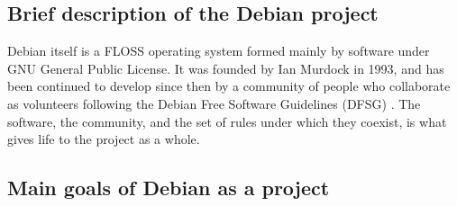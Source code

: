 \documentclass[11pt]{article} %
\begin{document}
\subsection{Brief description of the Debian project}

Debian itself is a FLOSS operating system formed mainly by software under GNU General Public License. It was founded by Ian Murdock in 1993, and has been continued to develop since then by a community of people who collaborate as volunteers following the Debian Free Software Guidelines (DFSG) \cite{Perens et al:2004bp}. The software, the community, and the set of rules under which they coexist, is what gives life to the project as a whole.

\subsection{Main goals of Debian as a project}
\end{document}

